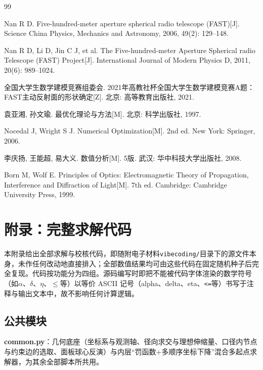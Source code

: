 \documentclass[withoutpreface]{cumcmthesis}
\begin{document}
\begin{thebibliography}{99}

 Nan R D. Five-hundred-meter aperture spherical radio telescope (FAST)[J]. Science China Physics, Mechanics and Astronomy, 2006, 49(2): 129--148.

 Nan R D, Li D, Jin C J, et al. The Five-hundred-meter Aperture Spherical radio Telescope (FAST) Project[J]. International Journal of Modern Physics D, 2011, 20(6): 989--1024.

 全国大学生数学建模竞赛组委会. 2021年高教社杯全国大学生数学建模竞赛A题：FAST主动反射面的形状确定[Z]. 北京: 高等教育出版社, 2021.

 袁亚湘, 孙文瑜. 最优化理论与方法[M]. 北京: 科学出版社, 1997.

 Nocedal J, Wright S J. Numerical Optimization[M]. 2nd ed. New York: Springer, 2006.

 李庆扬, 王能超, 易大义. 数值分析[M]. 5版. 武汉: 华中科技大学出版社, 2008.

 Born M, Wolf E. Principles of Optics: Electromagnetic Theory of Propagation, Interference and Diffraction of Light[M]. 7th ed. Cambridge: Cambridge University Press, 1999.

\end{thebibliography}

\clearpage

\appendix
\section{附录：完整求解代码}

本附录给出全部求解与校核代码，即随附电子材料\texttt{vibecoding/}目录下的源文件本身，未作任何改动地直接排入；全部数值结果均可由这些代码在固定随机种子后完全复现。代码按功能分为四组。源码编写时即把不能被代码字体渲染的数学符号（如$\alpha$、$\delta$、$\eta$、$\le$等）以等价 ASCII 记号（alpha、delta、eta、\texttt{<=}等）书写于注释与输出文本中，故不影响任何计算逻辑。

\subsection{公共模块}

\textbf{common.py}：几何底座（坐标系与观测轴、径向求交与理想伸缩量、口径内节点与约束边的选取、面板球心反演）与内层``罚函数$+$多顺序坐标下降''混合多起点求解器，为其余全部脚本所共用。
\end{document}
